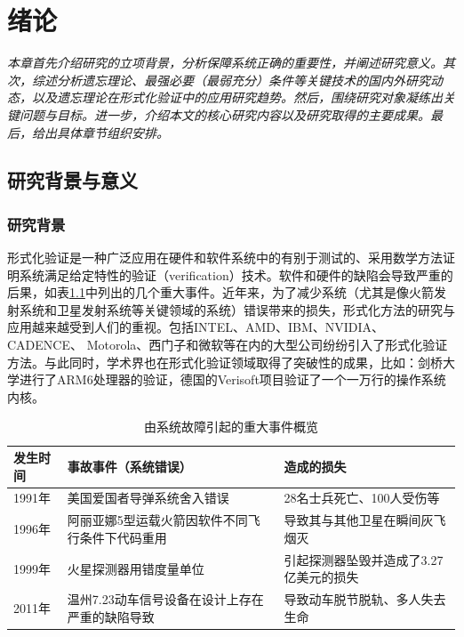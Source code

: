 \chapter{绪论}\label{chapter01}
{\em 本章首先介绍研究的立项背景，分析保障系统正确的重要性，并阐述研究意义。其次，综述分析遗忘理论、最强必要（最弱充分）条件等关键技术的国内外研究动态，以及遗忘理论在形式化验证中的应用研究趋势。然后，围绕研究对象凝练出关键问题与目标。进一步，介绍本文的核心研究内容以及研究取得的主要成果。最后，给出具体章节组织安排。}
\section{研究背景与意义}
\subsection{研究背景}

形式化验证是一种广泛应用在硬件\cite{lam2007,lv2000,jani2007Verilog}和软件系统中\cite{yuan2008,gu2005}的有别于测试的、采用数学方法证明系统满足给定特性的验证（verification）技术。软件和硬件的缺陷会导致严重的后果，如表\ref{tab:systemEvents_1.1}中列出的几个重大事件。近年来，为了减少系统（尤其是像火箭发射系统和卫星发射系统等关键领域的系统）错误带来的损失，形式化方法的研究与应用越来越受到人们的重视。包括INTEL、AMD、IBM、NVIDIA、CADENCE、 Motorola、西门子和微软等在内的大型公司纷纷引入了形式化验证方法。与此同时，学术界也在形式化验证领域取得了突破性的成果，比如：剑桥大学进行了ARM6处理器的验证\cite{DBLP:conf/tphol/Fox03}，德国的Verisoft项目验证了一个一万行的操作系统内核\cite{DBLP:conf/sefm/DaumSS09}。

\begin{table}[htbp]
\caption{由系统故障引起的重大事件概览}
\label{tab:systemEvents_1.1}
\centering
\fontsize{10pt}{\baselineskip}\selectfont
\begin{tabular}{p{}p{}p{}}%
	\toprule
	\textbf{发生时间}&\textbf{事故事件（系统错误）}&\textbf{造成的损失}\\
	\midrule
    1991年 & 美国爱国者导弹系统舍入错误 & 28名士兵死亡、100人受伤等\\
	1996年 & 阿丽亚娜5型运载火箭因软件不同飞行条件下代码重用 & 导致其与其他卫星在瞬间灰飞烟灭\\
	1999年 & 火星探测器用错度量单位 & 引起探测器坠毁并造成了3.27亿美元的损失\\
	2011年 & 温州7.23动车信号设备在设计上存在严重的缺陷导致 &导致动车脱节脱轨、多人失去生命\\
	
\bottomrule
\end{tabular}
\end{table}

